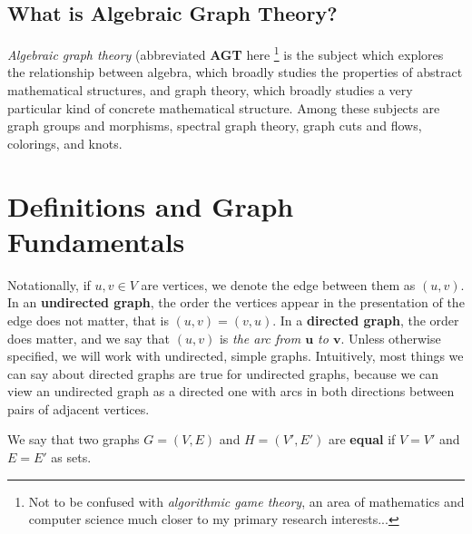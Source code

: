 \classheader{}


\subsection*{What is Algebraic Graph Theory?}

\textit{Algebraic graph theory} (abbreviated \textbf{AGT} here \footnote{Not to be confused with \textit{algorithmic game theory}, an area of mathematics and computer science much closer to my primary research interests...} is the subject which explores the relationship between algebra, which broadly studies the properties of abstract mathematical structures, and graph theory, which broadly studies a very particular kind of concrete mathematical structure.  Among these subjects are graph groups and morphisms, spectral graph theory, graph cuts and flows, colorings, and knots.






\section*{Definitions and Graph Fundamentals}



Notationally, if $u,v\in V$ are vertices, we denote the edge between them as $(u,v)$.  In an \textbf{undirected graph}, the order the vertices appear in the presentation of the edge does not matter, that is $(u,v)=(v,u)$.  In a \textbf{directed graph}, the order does matter, and we say that $(u,v)$ is \textit{the arc from $\boldsymbol{u}$ to $\boldsymbol{v}$}.  Unless otherwise specified, we will work with undirected, simple graphs.  Intuitively, most things we can say about directed graphs are true for undirected graphs, because we can view an undirected graph as a directed one with arcs in both directions between pairs of adjacent vertices.

We say that two graphs $G=(V,E)$ and $H=(V',E')$ are \textbf{equal} if $V=V'$ and $E=E'$ as sets.


